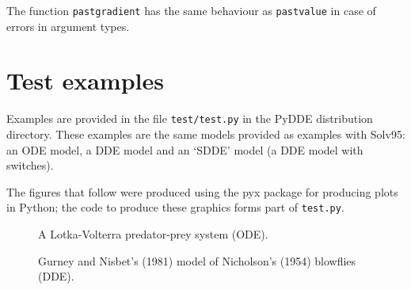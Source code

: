 \documentclass[10pt,a4paper] {article}
\begin{document}
The function \verb+pastgradient+ has the same behaviour as \verb+pastvalue+ in case of errors in argument types.

\section{Test examples}

Examples are provided in the file \verb+test/test.py+ in the PyDDE distribution directory.  These examples are the same models provided as examples with Solv95: an ODE model, a DDE model and an `SDDE' model (a DDE model with switches).

The figures that follow were produced using the pyx package for producing plots in Python; the code to produce these graphics forms part of \verb+test.py+.

\begin{figure}[bp]
\begin{center}
\caption{A Lotka-Volterra predator-prey system (ODE).}\label{fig:ode}
\end{center}
\end{figure}

\begin{figure}[bp]
\begin{center}
\caption{Gurney and Nisbet's (1981) model of Nicholson's (1954) blowflies (DDE).}\label{fig:dde}
\end{center}
\end{figure}
\end{document}
